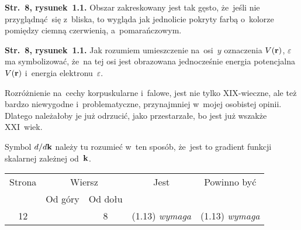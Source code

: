 \documentclass[a4paper,11pt]{article}
\numberwithin{equation}{section}
\begin{document}
\vspace{0em}


\noindent
\textbf{Str.~8, rysunek~1.1.} Obszar zakreskowany jest tak gęsto,
że~jeśli nie przyglądnąć~się z~bliska, to wygląda jak jednolicie
pokryty farbą o~kolorze pomiędzy ciemną czerwienią, a~pomarańczowym.

\VerSpaceFour





\noindent
\textbf{Str.~8, rysunek~1.1.} Jak rozumiem umieszczenie na~osi~$y$
oznaczenia $V( \mathbf{r} )$, $\varepsilon$ ma symbolizować, że~na tej osi jest
obrazowana jednocześnie energia potencjalna $V( \mathbf{r} )$ i~energia
elektronu~$\varepsilon$.

\VerSpaceFour





\noindent
{} Rozróżnienie na~cechy korpuskularne i~falowe, jest nie tylko
XIX-wieczne, ale też bardzo niewygodne i~problematyczne, przynajmniej
w~mojej osobistej opinii. Dlatego należałoby je już odrzucić, jako
przestarzałe, bo jest już wszakże XXI~wiek.

\VerSpaceFour





\noindent
{} Symbol $d / d\mathbf{k}$ należy tu rozumieć w~ten sposób,
że~jest to gradient funkcji skalarnej zależnej od~$\mathbf{k}$.






\newpage



\begin{center}

  \begin{tabular}{|c|c|c|c|c|}
    \hline
    Strona & \multicolumn{2}{c|}{Wiersz} & Jest
                              & Powinno być \\ \cline{2-3}
    & Od góry & Od dołu & & \\ \hline
    12 & & 8 & (1.13){ }{ }\textit{wymaga} & (1.13) \textit{wymaga} \\
    \hline
  \end{tabular}

\end{center}

\VerSpaceTwo

















\printbibliography





\end{document}
